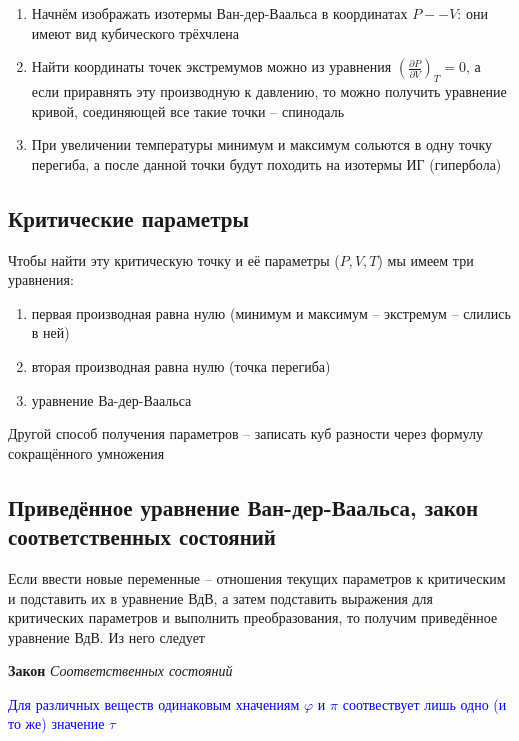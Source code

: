 \documentclass[a4paper, 14pt]{article}
\begin{document}
    \begin{enumerate}
        \item Начнём изображать изотермы Ван-дер-Ваальса в координатах $P -- V$: они имеют вид кубического трёхчлена
        \item Найти координаты точек экстремумов можно из уравнения $(\frac{\partial P}{\partial V})_T = 0$, а если
        приравнять эту производную к давлению, то можно получить уравнение кривой, соединяющей все такие точки --
        спинодаль
        \item При увеличении температуры минимум и максимум сольются в одну точку перегиба, а после данной точки
        будут походить на изотермы ИГ (гипербола)
    \end{enumerate}

    \subsection{Критические параметры}

    Чтобы найти эту критическую точку и её параметры ($P, V, T$) мы имеем три уравнения:

    \begin{enumerate}
        \item первая производная равна нулю (минимум и максимум -- экстремум -- слились в ней)
        \item вторая производная равна нулю (точка перегиба)
        \item уравнение Ва-дер-Ваальса
    \end{enumerate}

    Другой способ получения параметров -- записать куб разности через формулу сокращённого умножения

    \subsection{Приведённое уравнение Ван-дер-Ваальса, закон соответственных состояний}

    Если ввести новые переменные -- отношения текущих параметров к критическим и подставить их в уравнение ВдВ, а
    затем подставить выражения для критических параметров и выполнить преобразования, то получим приведённое
    уравнение ВдВ.
    Из него следует

    \textbf{Закон} \textit{Соответственных состояний}

    \textcolor{blue}{Для различных веществ одинаковым хначениям $\varphi$ и $\pi$ соотвествует лишь одно (и то же)
        значение $\tau$}
\end{document}

